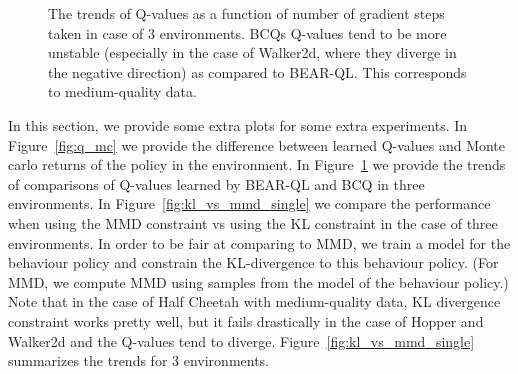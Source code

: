 \begin{figure}[h]
\begin{subfigure}[h]{0.31\textwidth}
    \end{subfigure}%
    \caption{The trends of Q-values as a function of number of gradient steps taken in case of 3 environments. BCQs Q-values tend to be more unstable (especially in the case of Walker2d, where they diverge in the negative direction) as compared to BEAR-QL. This corresponds to medium-quality data.}
    \label{fig:q_val_mediocre}
\end{figure}

In this section, we provide some extra plots for some extra experiments. In Figure~\ref{fig:q_mc} we provide the difference between learned Q-values and Monte carlo returns of the policy in the environment. In Figure~\ref{fig:q_val_mediocre} we provide the trends of comparisons of Q-values learned by BEAR-QL and BCQ in three environments. In Figure~\ref{fig:kl_vs_mmd_single} we compare the performance when using the MMD constraint vs using the KL constraint in the case of three environments. 
In order to be fair at comparing to MMD, we train a model for the behaviour policy and constrain the KL-divergence to this behaviour policy. (For MMD, we compute MMD using samples from the model of the behaviour policy.) Note that in the case of Half Cheetah with medium-quality data, KL divergence constraint works pretty well, but it fails drastically in the case of Hopper and Walker2d and the Q-values tend to diverge. Figure~\ref{fig:kl_vs_mmd_single} summarizes the trends for 3 environments.

